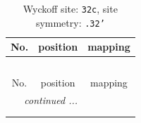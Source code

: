 \documentclass[fleqn,8pt]{jsarticle}
\begin{document}
\renewcommand{\arraystretch}{1.2}
\begin{longtable}{ccc}
\caption{Wyckoff site: {\tt 32c}, site symmetry: {\tt .32'}}
 \\
 \hline \hline
No. & position & mapping \\ \hline \endfirsthead

\multicolumn{2}{l}{\tablename\ \thetable{}} \\
 \hline \hline
No. & position & mapping \\ \hline \endhead

 \hline \hline
\multicolumn{2}{r}{\footnotesize\it continued ...} \\ \endfoot

 \hline \hline
\multicolumn{2}{r}{} \\ \endlastfoot


\end{longtable}
\end{document}
